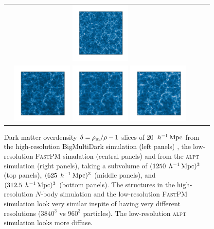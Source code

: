 \begin{figure}
\begin{tabular}{ccc}
\includegraphics[width=0.3\textwidth]{figures/mocks/alpt_medium.pdf}\\
\includegraphics[width=0.3\textwidth]{figures/mocks/bigmd_small.pdf}
\includegraphics[width=0.3\textwidth]{figures/mocks/fastpm_small.pdf}
\includegraphics[width=0.3\textwidth]{figures/mocks/alpt_small.pdf}
\end{tabular}
\caption{\label{fig:darkmatter} Dark matter overdensity $\delta = \rho_{\rm m}/\rho -1$ slices of 20 $\,h^{-1}\,{\rm Mpc}$ from the high-resolution BigMultiDark simulation (left panels) , the low-resolution \textsc{FastPM} simulation (central panels) and from the \textsc{alpt} simulation (right panels), taking a subvolume of $(1250 \;\,h^{-1}\,{\rm Mpc})^3$ (top panels), $(625 \;\,h^{-1}\,{\rm Mpc})^3$ (middle panels), and $(312.5 \;\,h^{-1}\,{\rm Mpc})^3$ (bottom panels). The structures in the high-resolution $N$-body simulation and the low-resolution \textsc{FastPM} simulation look very similar inspite of having very different resolutions ($3840^3$ vs $960^3$ particles). The low-resolution \textsc{alpt} simulation looks more diffuse.}
\end{figure}


